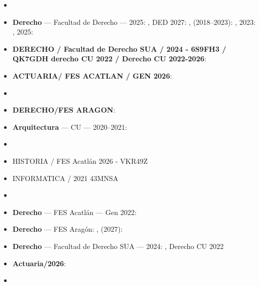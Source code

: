 \begin{itemize}[leftmargin=*]
  \item {}
  \item \textbf{Derecho} --- Facultad de Derecho --- 2025: , DED 2027: , (2018--2023): , 2023: , 2025: 
  \item \textbf{DERECHO / Facultad de Derecho SUA / 2024 - 6S9FH3 / QK7GDH derecho CU 2022 / Derecho CU 2022-2026}: 
  \item \textbf{ACTUARIA/ FES ACATLAN / GEN 2026}: 
  \item {}
  \item \textbf{DERECHO/FES ARAGON}: 
  \item \textbf{Arquitectura} --- CU --- 2020--2021: 
  \item {}
  \item HISTORIA / FES Acatlán 2026 - VKR49Z
  \item INFORMATICA / 2021 43MNSA
  \item {}
  \item \textbf{Derecho} --- FES Acatlán --- Gen 2022: 
  \item \textbf{Derecho} --- FES Aragón: , (2027): 
  \item \textbf{Derecho} --- Facultad de Derecho SUA --- 2024: , Derecho CU 2022
  \item \textbf{Actuaria/2026}: 
  \item {}
\end{itemize}
